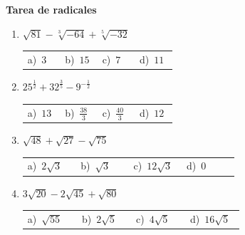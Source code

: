 \documentclass[11pt,a4paper]{article}
\begin{document}
{\Large\bfseries Tarea de radicales}
\vspace{12pt}
\begin{enumerate}[label=\textbf{\arabic*.},leftmargin=*,itemsep=11pt,topsep=0pt]
\item \begin{minipage}[t]{\linewidth}
$\displaystyle \sqrt{81}-\sqrt[3]{-64}+\sqrt[5]{-32}$

\vspace{5pt}
\begin{tabular}{@{}p{0.23\linewidth}p{0.23\linewidth}p{0.23\linewidth}p{0.23\linewidth}@{}}
a)~$\displaystyle 3$ & b)~$\displaystyle 15$ & c)~$\displaystyle 7$ & d)~$\displaystyle 11$ \\
\end{tabular}
\end{minipage}

\item \begin{minipage}[t]{\linewidth}
$\displaystyle 25^{\frac{1}{2}}+32^{\frac{3}{5}}-9^{-\frac{1}{2}}$

\vspace{5pt}
\begin{tabular}{@{}p{0.23\linewidth}p{0.23\linewidth}p{0.23\linewidth}p{0.23\linewidth}@{}}
a)~$\displaystyle 13$ & b)~$\displaystyle \frac{38}{3}$ & c)~$\displaystyle \frac{40}{3}$ & d)~$\displaystyle 12$ \\
\end{tabular}
\end{minipage}

\item \begin{minipage}[t]{\linewidth}
$\displaystyle \sqrt{48}+\sqrt{27}-\sqrt{75}$

\vspace{5pt}
\begin{tabular}{@{}p{0.23\linewidth}p{0.23\linewidth}p{0.23\linewidth}p{0.23\linewidth}@{}}
a)~$\displaystyle 2\sqrt{3}$ & b)~$\displaystyle \sqrt{3}$ & c)~$\displaystyle 12\sqrt{3}$ & d)~$\displaystyle 0$ \\
\end{tabular}
\end{minipage}

\item \begin{minipage}[t]{\linewidth}
$\displaystyle 3\sqrt{20}-2\sqrt{45}+\sqrt{80}$

\vspace{5pt}
\begin{tabular}{@{}p{0.23\linewidth}p{0.23\linewidth}p{0.23\linewidth}p{0.23\linewidth}@{}}
a)~$\displaystyle \sqrt{55}$ & b)~$\displaystyle 2\sqrt{5}$ & c)~$\displaystyle 4\sqrt{5}$ & d)~$\displaystyle 16\sqrt{5}$ \\
\end{tabular}
\end{minipage}


\end{enumerate}
\end{document}
